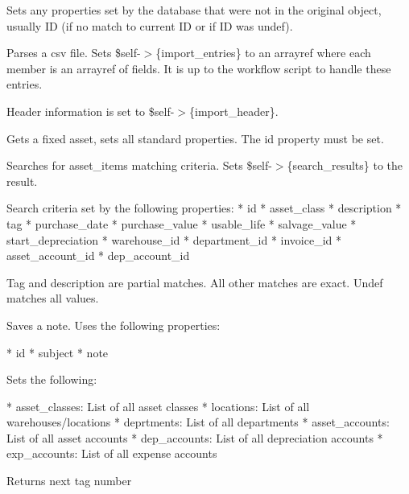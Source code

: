 \begin{description}
\begin{description}
\begin{description}
\begin{description}
\begin{description}
\begin{description}
\begin{description}
\begin{description}
\begin{description}
\begin{description}
Sets any properties set by the database that were not in the original object,
usually ID (if no match to current ID or if ID was undef).


\item[{import\_file}] \mbox{}

Parses a csv file.  Sets \$self-$>$\{import\_entries\} to an arrayref where each
member is an arrayref of fields.  It is up to the workflow script to handle 
these entries.



Header information is set to \$self-$>$\{import\_header\}.


\item[{get}] \mbox{}

Gets a fixed asset, sets all standard properties.  The id property must be set.


\item[{search}] \mbox{}

Searches for asset\_items matching criteria.  Sets \$self-$>$\{search\_results\} to 
the result.



Search criteria set by the following properties:
* id
* asset\_class
* description
* tag
* purchase\_date
* purchase\_value
* usable\_life
* salvage\_value 
* start\_depreciation
* warehouse\_id
* department\_id
* invoice\_id 
* asset\_account\_id
* dep\_account\_id



Tag and description are partial matches.  All other matches are exact.  Undef
matches all values.


\item[{save\_note}] \mbox{}

Saves a note.  Uses the following properties:



* id
* subject
* note


\item[{get\_metadata}] \mbox{}

Sets the following:



* asset\_classes:  List of all asset classes
* locations:  List of all warehouses/locations
* deprtments:  List of all departments
* asset\_accounts:  List of all asset accounts
* dep\_accounts:  List of all depreciation accounts
* exp\_accounts:  List of all expense accounts


\item[{get\_next\_tag}] \mbox{}

Returns next tag number




\end{description}
\end{description}
\end{description}
\end{description}
\end{description}
\end{description}
\end{description}
\end{description}
\end{description}
\end{description}
